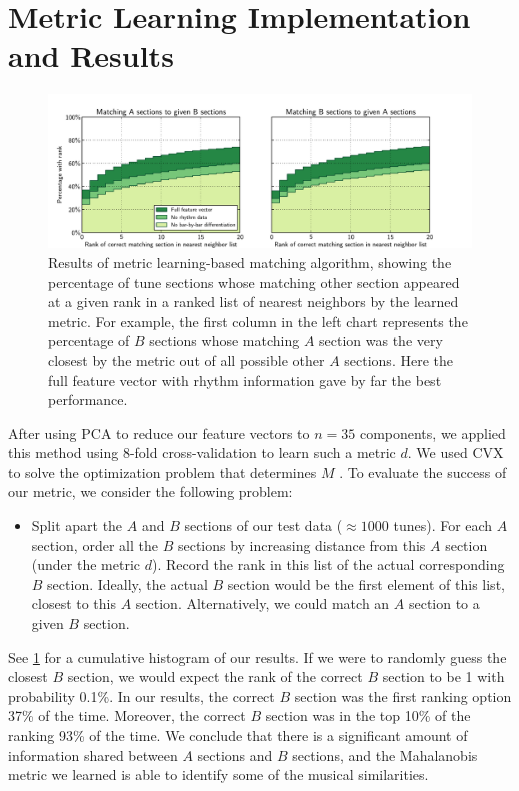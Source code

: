 \documentclass{article} %
\begin{document}
\section{Metric Learning Implementation and Results}
\begin{figure}
  \includegraphics[width=5.8in]{../trial_data_logs/hists.pdf}
  \caption{
    Results of metric learning-based matching algorithm, showing the percentage
    of tune sections whose matching other section appeared at a given rank in a
    ranked list of nearest neighbors by the learned metric. For example, the
    first column in the left chart represents the percentage of $B$ sections
    whose matching $A$ section was the very closest by the metric out of all
    possible other $A$ sections. Here the full feature vector with rhythm
    information gave by far the best performance.
  }
  \label{hists}
\end{figure}

After using PCA to reduce our feature vectors to $n = 35$ components, we applied
this method using 8-fold cross-validation to learn such a metric $d$. We used
CVX to solve the optimization problem that determines $M$ \cite{cvx}.
To evaluate the success of our metric, we consider the following problem:
\begin{itemize}
\item[] Split apart the $A$ and $B$ sections of our test data ($\approx 1000$
tunes). For each $A$ section, order all the $B$ sections by increasing distance
from this $A$ section (under the metric $d$). Record the rank in this list of
the actual corresponding $B$ section. Ideally, the actual $B$ section would be
the first element of this list, closest to this $A$ section. Alternatively, we
could match an $A$ section to a given $B$ section.
\end{itemize}
See \cref{hists} for a cumulative histogram of our results.
If we were to randomly guess the closest $B$ section, we would expect the rank
of the correct $B$ section to be 1 with probability 0.1\%. In our results, the
correct $B$ section was the first ranking option 37\% of the time. Moreover, the
correct $B$ section was in the top 10\% of the ranking 93\% of the time. We
conclude that there is a significant amount of information shared between $A$
sections and $B$ sections, and the Mahalanobis metric we learned is able to
identify some of the musical similarities.
\end{document}
